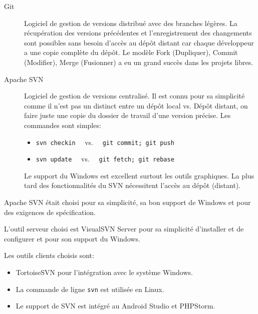 \begin{description}
    \item [Git] Logiciel de gestion de versions distribué avec des branches
        légères. La récupération des versions précédentes et l'enregistrement
        des changements sont possibles sans besoin d'accès au dépôt distant car
        chaque développeur a une copie complète du dépôt. Le modèle Fork
        (Dupliquer), Commit (Modifier), Merge (Fusionner) a eu un grand succès
        dans les projets libres.
    \item [Apache SVN] Logiciel de gestion de versions centralisé. Il est connu
        pour sa simplicité comme il n'est pas un distinct entre un dépôt local
        vs. Dépôt distant, on faire juste une copie du dossier de travail d'une
        version précise. Les commandes sont simples:
        \begin{itemize}
            \item \verb|svn checkin| \ \ vs. \ \ \verb|git commit; git push|
            \item \verb|svn update| \ \ vs. \ \ \verb|git fetch; git rebase|
        \end{itemize}
        Le support du Windows est excellent surtout les outils graphiques. La
        plus tard des fonctionnalités du SVN nécessitent l'accès au dépôt
        (distant).
\end{description}

Apache SVN était choisi pour sa simplicité, sa bon support de Windows et pour
des exigences de spécification. 

L'outil serveur choisi est VisualSVN Server pour sa simplicité d'installer et
de configurer et pour son support du Windows.

Les outils clients choisis sont:

\begin{itemize}
    \item TortoiseSVN pour l'intégration avec le système Windows.
    \item La commande de ligne \verb|svn| est utilisée en Linux.
    \item Le support de SVN est intégré au Android Studio et PHPStorm.
\end{itemize}

